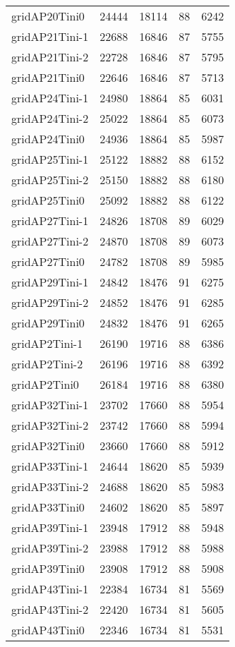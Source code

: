 \begin{longtable}{lrrrr}
gridAP20Tini0 & 24444 & 18114 & 88 & 6242 \\
gridAP21Tini-1 & 22688 & 16846 & 87 & 5755 \\
gridAP21Tini-2 & 22728 & 16846 & 87 & 5795 \\
gridAP21Tini0 & 22646 & 16846 & 87 & 5713 \\
gridAP24Tini-1 & 24980 & 18864 & 85 & 6031 \\
gridAP24Tini-2 & 25022 & 18864 & 85 & 6073 \\
gridAP24Tini0 & 24936 & 18864 & 85 & 5987 \\
gridAP25Tini-1 & 25122 & 18882 & 88 & 6152 \\
gridAP25Tini-2 & 25150 & 18882 & 88 & 6180 \\
gridAP25Tini0 & 25092 & 18882 & 88 & 6122 \\
gridAP27Tini-1 & 24826 & 18708 & 89 & 6029 \\
gridAP27Tini-2 & 24870 & 18708 & 89 & 6073 \\
gridAP27Tini0 & 24782 & 18708 & 89 & 5985 \\
gridAP29Tini-1 & 24842 & 18476 & 91 & 6275 \\
gridAP29Tini-2 & 24852 & 18476 & 91 & 6285 \\
gridAP29Tini0 & 24832 & 18476 & 91 & 6265 \\
gridAP2Tini-1 & 26190 & 19716 & 88 & 6386 \\
gridAP2Tini-2 & 26196 & 19716 & 88 & 6392 \\
gridAP2Tini0 & 26184 & 19716 & 88 & 6380 \\
gridAP32Tini-1 & 23702 & 17660 & 88 & 5954 \\
gridAP32Tini-2 & 23742 & 17660 & 88 & 5994 \\
gridAP32Tini0 & 23660 & 17660 & 88 & 5912 \\
gridAP33Tini-1 & 24644 & 18620 & 85 & 5939 \\
gridAP33Tini-2 & 24688 & 18620 & 85 & 5983 \\
gridAP33Tini0 & 24602 & 18620 & 85 & 5897 \\
gridAP39Tini-1 & 23948 & 17912 & 88 & 5948 \\
gridAP39Tini-2 & 23988 & 17912 & 88 & 5988 \\
gridAP39Tini0 & 23908 & 17912 & 88 & 5908 \\
gridAP43Tini-1 & 22384 & 16734 & 81 & 5569 \\
gridAP43Tini-2 & 22420 & 16734 & 81 & 5605 \\
gridAP43Tini0 & 22346 & 16734 & 81 & 5531 \\

\end{longtable}
